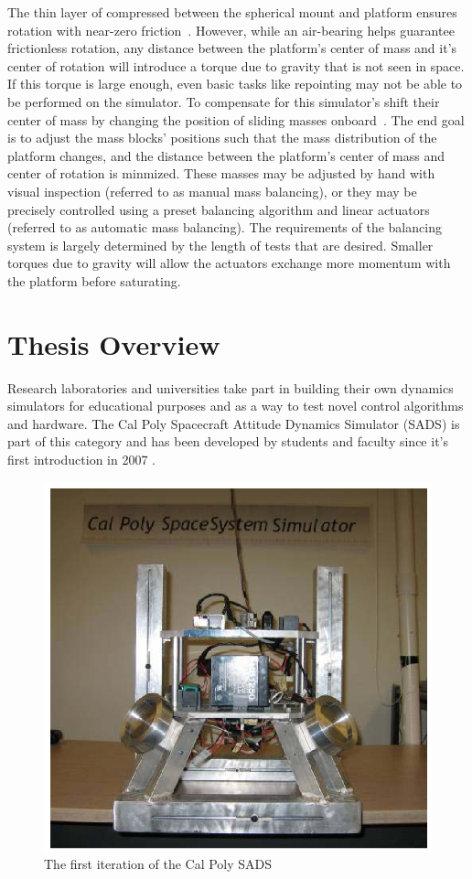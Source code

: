 The thin layer of compressed between the spherical mount and platform ensures rotation with near-zero friction~\cite{huang_characterizing_2022}. However, while an air-bearing helps guarantee frictionless rotation, any distance between the platform's center of mass and it's center of rotation will introduce a torque due to gravity that is not seen in space. If this torque is large enough, even basic tasks like repointing may not be able to be performed on the simulator. To compensate for this simulator's shift their center of mass by changing the position of sliding masses onboard~\cite{kim_automatic_2009}. The end goal is to adjust the mass blocks' positions such that the mass distribution of the platform changes, and the distance between the platform's center of mass and center of rotation is minmized. These masses may be adjusted by hand with visual inspection (referred to as manual mass balancing), or they may be precisely controlled using a preset balancing algorithm and linear actuators (referred to as automatic mass balancing). The requirements of the balancing system is largely determined by the length of tests that are desired. Smaller torques due to gravity will allow the actuators exchange more momentum with the platform before saturating. 


\section{Thesis Overview}\label{sec:previous_work}

Research laboratories and universities take part in building their own dynamics simulators for educational purposes and as a way to test novel control algorithms and hardware. The Cal Poly Spacecraft Attitude Dynamics Simulator (SADS) is part of this category and has been developed by students and faculty since it's first introduction in 2007 \cite{mittelsteadt_cal_2007}. 

\begin{figure}[h]\label{fig:V1}
    \centering
    \includegraphics[width=0.80\linewidth]{figures/SADS_V1.PNG}
    \caption{The first iteration of the Cal Poly SADS \cite{mittelsteadt_cal_2007}}
\end{figure}

